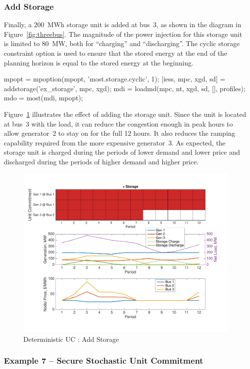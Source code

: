 \documentclass[12pt]{article}
\numberwithin{equation}{section}
\numberwithin{table}{section}
\numberwithin{figure}{section}
\begin{document}
\subsubsection*{Add Storage}
Finally, a 200~MWh storage unit is added at bus~3, as shown in the diagram in Figure~\ref{fig:threebus}. The magnitude of the power injection for this storage unit is limited to 80~MW, both for ``charging'' and ``discharging''. The cyclic storage constraint option is used to ensure that the stored energy at the end of the planning horizon is equal to the stored energy at the beginning.
\begin{Code}
mpopt = mpoption(mpopt, 'most.storage.cyclic', 1);
[iess, mpc, xgd, sd] = addstorage('ex_storage', mpc, xgd);
mdi = loadmd(mpc, nt, xgd, sd, [], profiles);
mdo = most(mdi, mpopt);
\end{Code}
Figure~\ref{fig:uc_ex_6} illustrates the effect of adding the storage unit. Since the unit is located at bus~3 with the load, it can reduce the congestion enough in peak hours to allow generator~2 to stay on for the full 12 hours. It also reduces the ramping capability required from the more expensive generator~3. As expected, the storage unit is charged during the periods of lower demand and lower price and discharged during the periods of higher demand and higher price.
\begin{figure}[hbt]
  \centering
  \includegraphics[width=\textwidth]{./figures/uc-ex-6}
  \caption{Deterministic UC : Add Storage}
  \label{fig:uc_ex_6}
\end{figure}


\subsubsection{Example 7 -- Secure Stochastic Unit Commitment}
\label{sec:tutex7}
\end{document}
